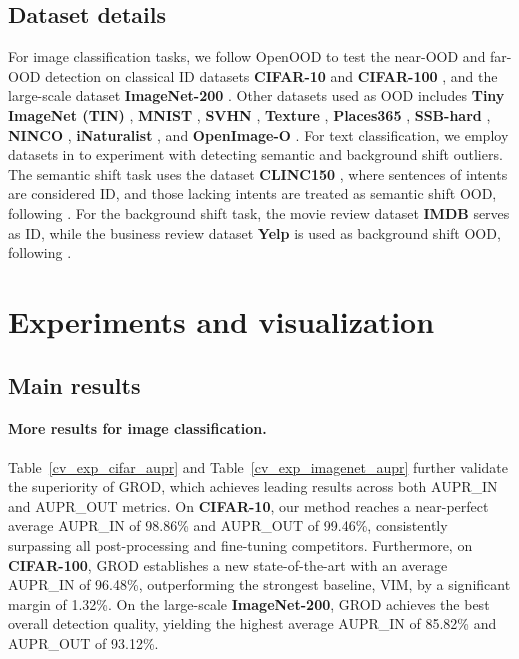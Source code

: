 \documentclass{article}
\theoremstyle{plain}
\theoremstyle{definition}
\theoremstyle{remark}
\begin{document}
\subsection{Dataset details}\label{appendix data}
For image classification tasks, we follow OpenOOD to test the near-OOD and far-OOD detection on classical ID datasets \textbf{CIFAR-10} and \textbf{CIFAR-100} \citep{krizhevsky2009learning}, and the large-scale dataset \textbf{ImageNet-200} \citep{deng2009imagenet}. Other datasets used as OOD includes \textbf{Tiny ImageNet (TIN)} \citep{le2015tiny}, \textbf{MNIST} \citep{deng2012mnist}, \textbf{SVHN} \citep{netzer2011reading}, \textbf{Texture} \citep{epperson2025texturestructuredexplorationtext}, \textbf{Places365} \citep{zhou2017places}, \textbf{SSB-hard} \citep{vaze2022openset, yang2022openood}, \textbf{NINCO} \citep{bitterwolf2023or}, \textbf{iNaturalist} \citep{van2018inaturalist}, and \textbf{OpenImage-O} \citep{kuznetsova2020open, yang2022openood}.
%
For text classification, we employ datasets in \citet{ouyang2023prefix} to experiment with detecting semantic and background shift outliers. 
The semantic shift task uses the dataset \textbf{CLINC150} \citep{larson2019evaluation}, where sentences of intents are considered ID, and those lacking intents are treated as semantic shift OOD, following \citet{podolskiy2021revisiting}.
For the background shift task, the movie review dataset \textbf{IMDB} \citep{maas2011learning} serves as ID, while the business review dataset \textbf{Yelp} \citep{zhang2015character} is used as background shift OOD, following \citet{arora2021types}. 


\section{Experiments and visualization}\label{Experiments and visualization}
\subsection{Main results} \label{main results}

\paragraph{More results for image classification. }
Table~\ref{cv_exp_cifar_aupr} and Table~\ref{cv_exp_imagenet_aupr} further validate the superiority of \textsc{GROD}, which achieves leading results across both AUPR\_IN and AUPR\_OUT metrics. On \textbf{CIFAR-10}, our method reaches a near-perfect average AUPR\_IN of 98.86\% and AUPR\_OUT of 99.46\%, consistently surpassing all post-processing and fine-tuning competitors. Furthermore, on \textbf{CIFAR-100}, \textsc{GROD} establishes a new state-of-the-art with an average AUPR\_IN of 96.48\%, outperforming the strongest baseline, \textsc{VIM}, by a significant margin of 1.32\%. On the large-scale \textbf{ImageNet-200}, \textsc{GROD} achieves the best overall detection quality, yielding the highest average AUPR\_IN of 85.82\% and AUPR\_OUT of 93.12\%.
\end{document}

